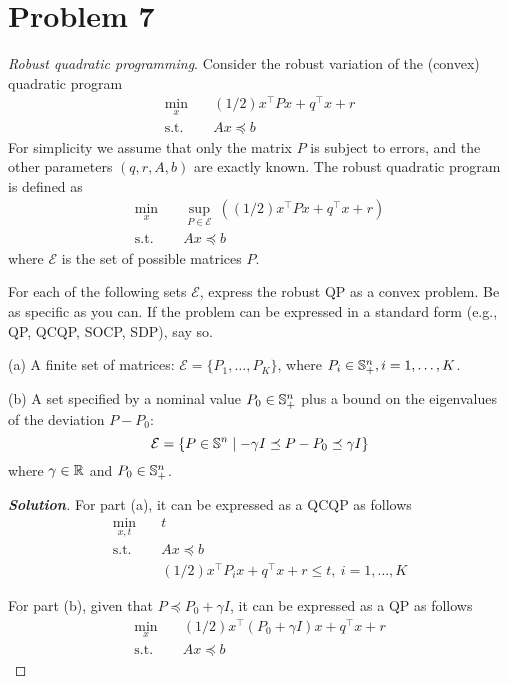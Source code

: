 \documentclass[11pt]{article}
\newenvironment{solution}
  {\renewcommand\qedsymbol{$\square$}\begin{proof}[\textbf{Solution}]}
  {\end{proof}}
\newcommand{\T}{^\top}
\begin{document}
\clearpage
\section*{Problem 7}
\textit{Robust quadratic programming}. Consider the robust variation of the (convex) quadratic program
\begin{align*}
  \min_x\quad & (1/2) x\T P x + q\T x + r\\
  \text{s.t.} \quad & Ax \preceq b
\end{align*}
For simplicity we assume that only the matrix $P$ is subject to errors, and the other parameters $(q, r, A, b)$ are exactly known. The robust quadratic program is defined as
\begin{align*}
  \min_x\quad & \sup_{P\in\mathcal{E}}\ ((1/2) x\T P x + q\T x + r)\\
  \text{s.t.} \quad & Ax \preceq b
\end{align*}
where $\mathcal{E}$ is the set of possible matrices $P$.

For each of the following sets $\mathcal{E}$, express the robust QP as a convex problem. Be as specific as you can. If the problem can be expressed in a standard form (e.g., QP, QCQP, SOCP, SDP), say so.

(a) A finite set of matrices: $\mathcal{E} = \{P_1, \dots, P_K\}$, where $P_i\in{{\mathbb{S}}}^n_+, i=1, \dots, K$.

(b) A set specified by a nominal value $P_0\in{{\mathbb{S}}}^n_+$ plus a bound on the eigenvalues of the deviation $P-P_0$:
\[
\mathcal{E} = \{P\in{{\mathbb{S}}}^n \mid -\gamma I \preceq P - P_0 \preceq \gamma I\}
\]
where $\gamma\in{{\mathbb{R}}}$ and $P_0\in{{\mathbb{S}}}^n_+$.

\begin{solution}
  For part (a), it can be expressed as a QCQP as follows
  \begin{align*}
    \min_{x, t} \quad & t\\
    \text{s.t.} \quad 
    &Ax \preceq b\\
    & (1/2) x\T P_i x + q\T x + r \leq t,\ i=1, \dots, K
  \end{align*}

  For part (b), given that $P \preceq P_0 + \gamma I$, it can be expressed as a QP as follows
  \begin{align*}
    \min_{x} \quad & (1/2) x\T (P_0 + \gamma I) x + q\T x + r\\
    \text{s.t.} \quad 
    &Ax \preceq b
  \end{align*}
\end{solution}
\end{document}
